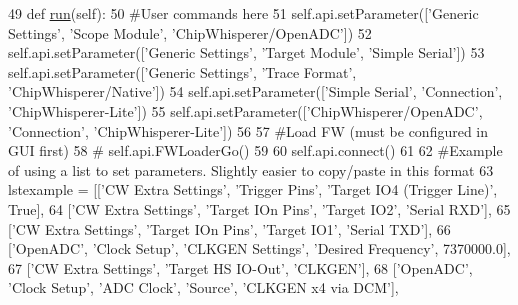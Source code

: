 \begin{DoxyCode}
49     \textcolor{keyword}{def }\hyperlink{classsoftware_1_1chipwhisperer_1_1capture_1_1scripts_1_1cwlite-simpleserialnotduino_1_1UserScript_abd8003387da659db60a73ee8eadebecf}{run}(self):
50         \textcolor{comment}{#User commands here}
51         self.api.setParameter([\textcolor{stringliteral}{'Generic Settings'}, \textcolor{stringliteral}{'Scope Module'}, \textcolor{stringliteral}{'ChipWhisperer/OpenADC'}])
52         self.api.setParameter([\textcolor{stringliteral}{'Generic Settings'}, \textcolor{stringliteral}{'Target Module'}, \textcolor{stringliteral}{'Simple Serial'}])
53         self.api.setParameter([\textcolor{stringliteral}{'Generic Settings'}, \textcolor{stringliteral}{'Trace Format'}, \textcolor{stringliteral}{'ChipWhisperer/Native'}])
54         self.api.setParameter([\textcolor{stringliteral}{'Simple Serial'}, \textcolor{stringliteral}{'Connection'}, \textcolor{stringliteral}{'ChipWhisperer-Lite'}])
55         self.api.setParameter([\textcolor{stringliteral}{'ChipWhisperer/OpenADC'}, \textcolor{stringliteral}{'Connection'}, \textcolor{stringliteral}{'ChipWhisperer-Lite'}])
56 
57         \textcolor{comment}{#Load FW (must be configured in GUI first)}
58         \textcolor{comment}{# self.api.FWLoaderGo()}
59 
60         self.api.connect()
61 
62         \textcolor{comment}{#Example of using a list to set parameters. Slightly easier to copy/paste in this format}
63         lstexample = [[\textcolor{stringliteral}{'CW Extra Settings'}, \textcolor{stringliteral}{'Trigger Pins'}, \textcolor{stringliteral}{'Target IO4 (Trigger Line)'}, \textcolor{keyword}{True}],
64                       [\textcolor{stringliteral}{'CW Extra Settings'}, \textcolor{stringliteral}{'Target IOn Pins'}, \textcolor{stringliteral}{'Target IO2'}, \textcolor{stringliteral}{'Serial RXD'}],
65                       [\textcolor{stringliteral}{'CW Extra Settings'}, \textcolor{stringliteral}{'Target IOn Pins'}, \textcolor{stringliteral}{'Target IO1'}, \textcolor{stringliteral}{'Serial TXD'}],
66                       [\textcolor{stringliteral}{'OpenADC'}, \textcolor{stringliteral}{'Clock Setup'}, \textcolor{stringliteral}{'CLKGEN Settings'}, \textcolor{stringliteral}{'Desired Frequency'}, 7370000.0],
67                       [\textcolor{stringliteral}{'CW Extra Settings'}, \textcolor{stringliteral}{'Target HS IO-Out'}, \textcolor{stringliteral}{'CLKGEN'}],
68                       [\textcolor{stringliteral}{'OpenADC'}, \textcolor{stringliteral}{'Clock Setup'}, \textcolor{stringliteral}{'ADC Clock'}, \textcolor{stringliteral}{'Source'}, \textcolor{stringliteral}{'CLKGEN x4 via DCM'}],

\end{DoxyCode}
